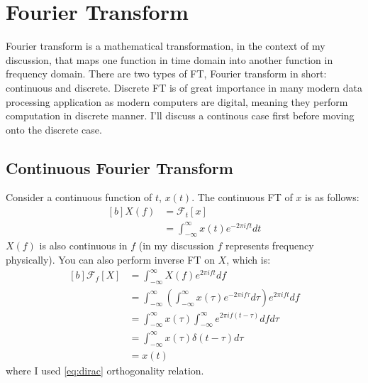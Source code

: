 \documentclass[letterpaper, 11pt]{article}
\newcommand{\fourier}[2]{\mathcal{F}_{#1}[#2]} %
\newcommand{\fint}{\int_{-\infty}^{\infty}} %
\newcommand{\ft}[2]{\fint #2 e^{-2\pi if#1} d#1} %
\newcommand{\ift}[2]{\fint #2 e^{2\pi i#1t} d#1} %
\numberwithin{equation}{section}
\begin{document}
\section{Fourier Transform}
Fourier transform is a mathematical transformation, in the context of my discussion, that maps one function in time domain into another function in frequency domain. There are two types of FT, Fourier transform in short: continuous and discrete. Discrete FT is of great importance in many modern data processing application as modern computers are digital, meaning they perform computation in discrete manner. I'll discuss a continous case first before moving onto the discrete case.

\subsection{Continuous Fourier Transform}
Consider a continuous function of \(t\), \(x(t)\). The continuous FT of \(x\) is as follows:
\begin{equation}
	\begin{aligned}[b]
		X(f)	&=\fourier{t}{x} \\
			&=\ft{t}{x(t)}
	\end{aligned}
\end{equation}
\(X(f)\) is also continuous in \(f\) (in my discussion \(f\) represents frequency physically). You can also perform inverse FT on \(X\), which is:
\begin{equation}
	\begin{aligned}[b]
		\fourier{f}{X}	&= \ift{f}{X(f)} \\
				&= \ift{f}{\left ( \ft{\tau}{x(\tau)}\right )} \\
				&= \fint x(\tau) \fint e^{2\pi if(t - \tau)} df d\tau \\
				&= \fint x(\tau) \delta (t - \tau) d\tau \\
				&= x(t)
	\end{aligned}
\end{equation}
where I used \eqref{eq:dirac} orthogonality relation.
\end{document}
